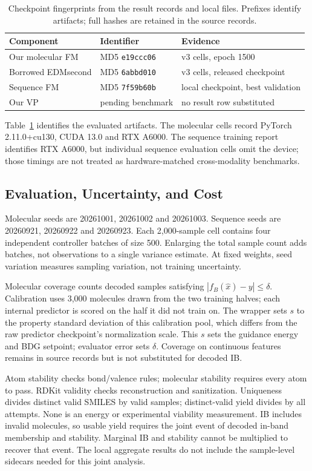 \documentclass{article}
\begin{document}
\begin{table}[!htbp]
\centering\small
\caption{Checkpoint fingerprints from the result records and local files. Prefixes identify artifacts; full hashes are retained in the source records.}
\label{tab:hashes}
\begin{tabular}{lll}
\toprule
Component & Identifier & Evidence\\
\midrule
Our molecular FM & MD5 \texttt{e19ccc06} & v3 cells, epoch 1500\\
Borrowed EDMsecond & MD5 \texttt{6abbd010} & v3 cells, released checkpoint\\
Sequence FM & MD5 \texttt{7f59b60b} & local checkpoint, best validation\\
Our VP & pending benchmark & no result row substituted\\
\bottomrule
\end{tabular}
\end{table}
Table~\ref{tab:hashes} identifies the evaluated artifacts. The molecular cells record PyTorch 2.11.0+cu130, CUDA 13.0 and RTX A6000. The sequence training report identifies RTX A6000, but individual sequence evaluation cells omit the device; those timings are not treated as hardware-matched cross-modality benchmarks.

\subsection{Evaluation, Uncertainty, and Cost}\label{app:evaluation}
Molecular seeds are 20261001, 20261002 and 20261003. Sequence seeds are 20260921, 20260922 and 20260923. Each 2,000-sample cell contains four independent controller batches of size 500. Enlarging the total sample count adds batches, not observations to a single variance estimate. At fixed weights, seed variation measures sampling variation, not training uncertainty.

Molecular coverage counts decoded samples satisfying $|f_B(\hat x)-y|\le\delta$. Calibration uses 3,000 molecules drawn from the two training halves; each internal predictor is scored on the half it did not train on. The wrapper sets $s$ to the property standard deviation of this calibration pool, which differs from the raw predictor checkpoint's normalization scale. This $s$ sets the guidance energy and BDG setpoint; evaluator error sets $\delta$. Coverage on continuous features remains in source records but is not substituted for decoded IB.

Atom stability checks bond/valence rules; molecular stability requires every atom to pass. RDKit validity checks reconstruction and sanitization. Uniqueness divides distinct valid SMILES by valid samples; distinct-valid yield divides by all attempts. None is an energy or experimental viability measurement. IB includes invalid molecules, so usable yield requires the joint event of decoded in-band membership and stability. Marginal IB and stability cannot be multiplied to recover that event. The local aggregate results do not include the sample-level sidecars needed for this joint analysis.
\end{document}
